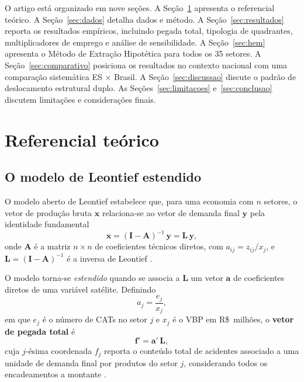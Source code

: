 \documentclass[12pt, a4paper]{article}
\begin{document}
O artigo está organizado em nove seções. A Seção~\ref{sec:teorico}
apresenta o referencial teórico. A Seção~\ref{sec:dados} detalha dados
e método. A Seção~\ref{sec:resultados} reporta os resultados empíricos,
incluindo pegada total, tipologia de quadrantes, multiplicadores de
emprego e análise de sensibilidade. A Seção~\ref{sec:hem} apresenta o
Método de Extração Hipotética para todos os 35 setores.
A Seção~\ref{sec:comparativo} posiciona os resultados no contexto
nacional com uma comparação sistemática ES $\times$ Brasil.
A Seção~\ref{sec:discussao} discute o padrão de deslocamento estrutural
duplo. As Seções~\ref{sec:limitacoes} e~\ref{sec:conclusao} discutem
limitações e considerações finais.

\section{Referencial teórico}
\label{sec:teorico}

\subsection{O modelo de Leontief estendido}

O modelo aberto de Leontief estabelece que, para uma economia com $n$
setores, o vetor de produção bruta $\mathbf{x}$ relaciona-se ao vetor de
demanda final $\mathbf{y}$ pela identidade fundamental
%
\begin{equation}
\mathbf{x} = (\mathbf{I} - \mathbf{A})^{-1}\, \mathbf{y} = \mathbf{L}\, \mathbf{y},
\label{eq:leontief}
\end{equation}
%
onde $\mathbf{A}$ é a matriz $n \times n$ de coeficientes técnicos
diretos, com $a_{ij} = z_{ij}/x_j$, e
$\mathbf{L} = (\mathbf{I}-\mathbf{A})^{-1}$ é a inversa de Leontief
\citep[cap.~2]{millerblair2009}.

O modelo torna-se \textit{estendido} quando se associa a $\mathbf{L}$
um vetor $\mathbf{a}$ de coeficientes diretos de uma variável satélite.
Definindo
%
\begin{equation}
a_j = \frac{e_j}{x_j},
\label{eq:coeficiente}
\end{equation}
%
em que $e_j$ é o número de CATs no setor $j$ e $x_j$ é o VBP em
R\$~milhões, o \textbf{vetor de pegada total} é
%
\begin{equation}
\mathbf{f}' = \mathbf{a}'\, \mathbf{L},
\label{eq:pegada}
\end{equation}
%
cuja $j$-ésima coordenada $f_j$ reporta o conteúdo total de acidentes
associado a uma unidade de demanda final por produtos do setor $j$,
considerando todos os encadeamentos a montante \citep[cap.~10]{millerblair2009}.
\end{document}
